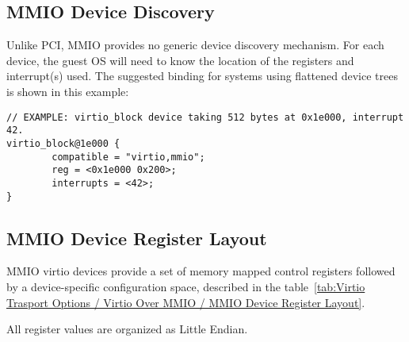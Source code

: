 \subsection{MMIO Device Discovery}\label{sec:Virtio Transport Options / Virtio Over MMIO / MMIO Device Discovery}

Unlike PCI, MMIO provides no generic device discovery mechanism.  For each
device, the guest OS will need to know the location of the registers
and interrupt(s) used.  The suggested binding for systems using
flattened device trees is shown in this example:

\begin{lstlisting}
// EXAMPLE: virtio_block device taking 512 bytes at 0x1e000, interrupt 42.
virtio_block@1e000 {
        compatible = "virtio,mmio";
        reg = <0x1e000 0x200>;
        interrupts = <42>;
}
\end{lstlisting}

\subsection{MMIO Device Register Layout}\label{sec:Virtio Transport Options / Virtio Over MMIO / MMIO Device Register Layout}

MMIO virtio devices provide a set of memory mapped control
registers followed by a device-specific configuration space,
described in the table~\ref{tab:Virtio Trasport Options / Virtio Over MMIO / MMIO Device Register Layout}.

All register values are organized as Little Endian.

\newcommand{\mmioreg}[5]{%
  {\field{#1}} \newline #3 \newline #4 & {\bf#2} \newline #5 \\
}

\newcommand{\mmiodreg}[7]{%
  {\field{#1}} \newline #4 \newline {\field{#2}} \newline #5 \newline #6 & {\bf#3} \newline #7 \\
}


